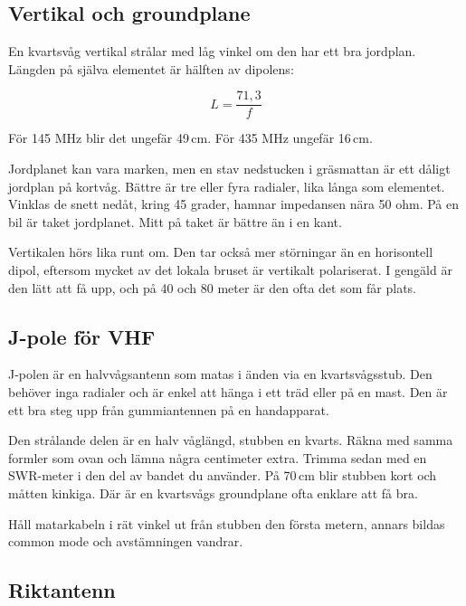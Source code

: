 \subsection{Vertikal och groundplane}

En kvartsvåg vertikal strålar med låg vinkel om den har ett bra jordplan.
Längden på själva elementet är hälften av dipolens:

\begin{equation}
	L = \frac{71,3}{f}
\end{equation}

För 145 MHz blir det ungefär 49\,cm. För 435 MHz ungefär 16\,cm.

Jordplanet kan vara marken, men en stav nedstucken i gräsmattan är ett
dåligt jordplan på kortvåg. Bättre är tre eller fyra radialer, lika långa
som elementet. Vinklas de snett nedåt, kring 45 grader, hamnar impedansen
nära 50 ohm. På en bil är taket jordplanet. Mitt på taket är bättre än
i en kant.

Vertikalen hörs lika runt om. Den tar också mer störningar än en
horisontell dipol, eftersom mycket av det lokala bruset är vertikalt
polariserat. I gengäld är den lätt att få upp, och på 40 och 80 meter är
den ofta det som får plats.

\subsection{J-pole för VHF}

J-polen är en halvvågsantenn som matas i änden via en kvartsvågsstub. Den
behöver inga radialer och är enkel att hänga i ett träd eller på en mast.
Den är ett bra steg upp från gummiantennen på en handapparat.

Den strålande delen är en halv våglängd, stubben en kvarts. Räkna med samma
formler som ovan och lämna några centimeter extra. Trimma sedan med en
SWR-meter i den del av bandet du använder. På 70\,cm blir stubben kort och
måtten kinkiga. Där är en kvartsvågs groundplane ofta enklare att få bra.

Håll matarkabeln i rät vinkel ut från stubben den första metern, annars
bildas common mode och avstämningen vandrar.

\subsection{Riktantenn}

